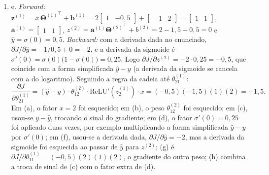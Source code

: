 \documentclass{dlproblemset}
\begin{document}
\begin{enumerate}[1)]
    \item e. \textit{Forward:} $\mathbf{z}^{(1)} = x\,{\mathbf{\Theta}^{(1)}}^{\top} + \mathbf{b}^{(1)} = 2\begin{bmatrix} 1 & -0{,}5 \end{bmatrix} + \begin{bmatrix} -1 & 2 \end{bmatrix} = \begin{bmatrix} 1 & 1 \end{bmatrix}$, $\mathbf{a}^{(1)} = \begin{bmatrix} 1 & 1 \end{bmatrix}$, $z^{(2)} = \mathbf{a}^{(1)}{\mathbf{\Theta}^{(2)}}^{\top} + b^{(2)} = 2 - 1{,}5 - 0{,}5 = 0$ e $\hat{y} = \sigma(0) = 0{,}5$. \textit{Backward:} com a derivada dada no enunciado, $\partial J/\partial \hat{y} = -1/0{,}5 + 0 = -2$, e a derivada da sigmoide é $\sigma'(0) = \sigma(0)\bigl(1 - \sigma(0)\bigr) = 0{,}25$. Logo $\partial J/\partial z^{(2)} = -2 \cdot 0{,}25 = -0{,}5$, que coincide com a forma simplificada $\hat{y} - y$ (a derivada da sigmoide se cancela com a do logaritmo). Seguindo a regra da cadeia até $\theta^{(1)}_{21}$:
    \[
    \frac{\partial J}{\partial \theta^{(1)}_{21}}
    = (\hat{y} - y)\cdot \theta^{(2)}_{12} \cdot \mathrm{ReLU}'(z^{(1)}_2) \cdot x
    = (-0{,}5)(-1{,}5)(1)(2) = +1{,}5 .
    \]
    Em (a), o fator $x = 2$ foi esquecido; em (b), o peso $\theta^{(2)}_{12}$ foi esquecido; em (c), usou-se $y - \hat{y}$, trocando o sinal do gradiente; em (d), o fator $\sigma'(0) = 0{,}25$ foi aplicado duas vezes, por exemplo multiplicando a forma simplificada $\hat{y} - y$ por $\sigma'(0)$; em (f), usou-se a derivada dada, $\partial J/\partial \hat{y} = -2$, mas a derivada da sigmoide foi esquecida ao passar de $\hat{y}$ para $z^{(2)}$; (g) é $\partial J/\partial \theta^{(1)}_{11} = (-0{,}5)(2)(1)(2)$, o gradiente do outro peso; (h) combina a troca de sinal de (c) com o fator extra de (d).
\end{enumerate}
\end{document}
